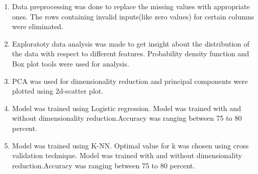 \documentclass[12pt]{article}
\begin{document}
\begin{enumerate}
\item Data preprocessing was done to replace the missing values with appropriate ones. The rows containing invalid inputs(like zero values) for certain columns were eliminated.
\item Exploratoty data analysis was made to get insight about the distribution of the data with respect to different  features. Probability density function and Box plot tools were used for analysis.
\item PCA was used for dimensionality reduction and principal components were plotted using 2d-scatter plot. 
\item Model was trained using Logistic regression. Model was trained with and without dimensionality reduction.Accuracy was ranging between 75 to 80 percent.
\item Model was trained using K-NN. Optimal value for k was chosen using cross validation technique. Model was trained with and without dimensionality reduction.Accuracy was ranging between 75 to 80 percent.

\end{enumerate}















 
\end{document}
